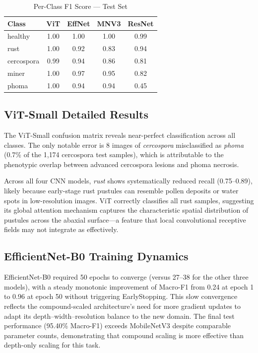 \documentclass[conference]{IEEEtran}
\begin{document}
\begin{table}[htbp]
  \centering
  \caption{Per-Class F1 Score — Test Set}
  \label{tab:perclass}
  \begin{tabular}{lcccc}
    \toprule
    \textbf{Class} & \textbf{ViT} & \textbf{EffNet} & \textbf{MNV3} & \textbf{ResNet} \\
    \midrule
    healthy    & 1.00 & 1.00 & 1.00 & 0.99 \\
    rust       & 1.00 & 0.92 & 0.83 & 0.94 \\
    cercospora & 0.99 & 0.94 & 0.86 & 0.81 \\
    miner      & 1.00 & 0.97 & 0.95 & 0.82 \\
    phoma      & 1.00 & 0.94 & 0.94 & 0.45 \\
    \bottomrule
  \end{tabular}
\end{table}

\subsection{ViT-Small Detailed Results}

The ViT-Small confusion matrix reveals near-perfect classification across
all classes. The only notable error is 8 images of \textit{cercospora}
misclassified as \textit{phoma} (0.7\% of the 1{,}174 cercospora test
samples), which is attributable to the phenotypic overlap between advanced
cercospora lesions and phoma necrosis.

Across all four CNN models, \textit{rust} shows systematically reduced
recall (0.75--0.89), likely because early-stage rust pustules can resemble
pollen deposits or water spots in low-resolution images. ViT correctly
classifies all rust samples, suggesting its global attention mechanism
captures the characteristic spatial distribution of pustules across the
abaxial surface—a feature that local convolutional receptive fields may
not integrate as effectively.

\subsection{EfficientNet-B0 Training Dynamics}

EfficientNet-B0 required 50 epochs to converge (versus 27--38 for the
other three models), with a steady monotonic improvement of Macro-F1 from
0.24 at epoch 1 to 0.96 at epoch 50 without triggering EarlyStopping.
This slow convergence reflects the compound-scaled architecture's need for
more gradient updates to adapt its depth--width--resolution balance to the
new domain. The final test performance (95.40\% Macro-F1) exceeds
MobileNetV3 despite comparable parameter counts, demonstrating that
compound scaling is more effective than depth-only scaling for this task.
\end{document}
